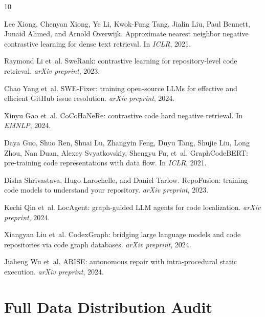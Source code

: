 \documentclass[11pt,a4paper]{article}
\begin{document}
\begin{thebibliography}{10}

Lee Xiong, Chenyan Xiong, Ye Li, Kwok-Fung Tang, Jialin Liu, Paul Bennett, Junaid Ahmed, and Arnold Overwijk.
\newblock Approximate nearest neighbor negative contrastive learning for dense text retrieval.
\newblock In \emph{ICLR}, 2021.

Raymond Li et~al.
\newblock SweRank: contrastive learning for repository-level code retrieval.
\newblock \emph{arXiv preprint}, 2023.

Chao Yang et~al.
\newblock SWE-Fixer: training open-source LLMs for effective and efficient GitHub issue resolution.
\newblock \emph{arXiv preprint}, 2024.

Xinyu Gao et~al.
\newblock CoCoHaNeRe: contrastive code hard negative retrieval.
\newblock In \emph{EMNLP}, 2024.

Daya Guo, Shuo Ren, Shuai Lu, Zhangyin Feng, Duyu Tang, Shujie Liu, Long Zhou, Nan Duan, Alexey Svyatkovskiy, Shengyu Fu, et~al.
\newblock GraphCodeBERT: pre-training code representations with data flow.
\newblock In \emph{ICLR}, 2021.

Disha Shrivastava, Hugo Larochelle, and Daniel Tarlow.
\newblock RepoFusion: training code models to understand your repository.
\newblock \emph{arXiv preprint}, 2023.

Kechi Qin et~al.
\newblock LocAgent: graph-guided LLM agents for code localization.
\newblock \emph{arXiv preprint}, 2024.

Xiangyan Liu et~al.
\newblock CodexGraph: bridging large language models and code repositories via code graph databases.
\newblock \emph{arXiv preprint}, 2024.

Jiaheng Wu et~al.
\newblock ARISE: autonomous repair with intra-procedural static execution.
\newblock \emph{arXiv preprint}, 2024.

\end{thebibliography}

\appendix

\section{Full Data Distribution Audit}
\label{app:audit}
\end{document}

